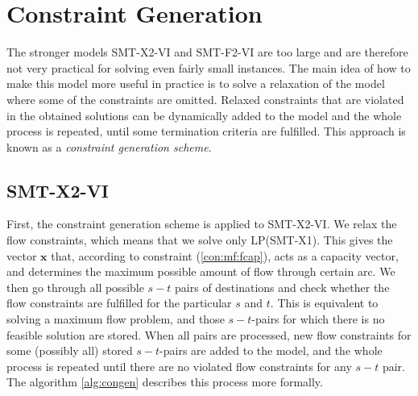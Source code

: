 
\section{Constraint Generation}
\label{sec:cg}
The stronger models SMT-X2-VI and SMT-F2-VI are too large and are therefore not very practical for solving even fairly small instances.  The main idea of how to make this model more useful in practice is to solve a relaxation of the model where some of the constraints are omitted. Relaxed constraints that are violated in the obtained solutions can be dynamically added to the model and the whole process is repeated, until some termination criteria are fulfilled. This approach is known as a \emph{constraint generation scheme}.

\subsection{SMT-X2-VI}%
First, the constraint generation scheme is applied to SMT-X2-VI. We relax the flow constraints, which means that we solve only LP(SMT-X1). This gives the vector $\mathbf{x}$ that, according to constraint (\ref{con:mf:fcap}), acts as a capacity vector, and determines the maximum possible amount of flow through certain arc. We then go through all possible $s-t$ pairs of destinations and check whether the flow constraints are fulfilled for the particular $s$ and $t$. This is equivalent to solving a maximum flow problem, and those $s-t$-pairs for which there is no feasible solution are stored. When all pairs are processed, new flow constraints for some (possibly all) stored $s-t$-pairs are added to the model, and the whole process is repeated until there are no violated flow constraints for any $s-t$ pair. The algorithm \ref{alg:congen} describes this process more formally.

